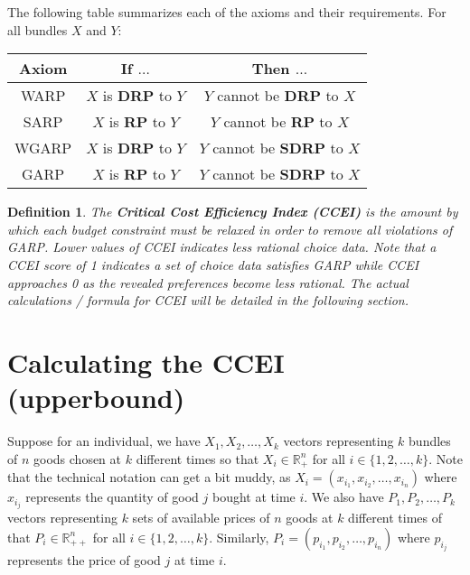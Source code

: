 \documentclass{article} %
\newtheorem{definition}{Definition} %
\begin{document}
The following table summarizes each of the axioms and their requirements. For all bundles $X$ and $Y$:

\renewcommand{\arraystretch}{1.5}
\begin{center}
\begin{tabular}{ c|c|c } 
Axiom & If $\ldots$ & Then $\ldots$ \\\hline
WARP&$X$ is \textbf{DRP} to $Y$&$Y$ cannot be \textbf{DRP} to $X$ \\
SARP&$X$ is \textbf{RP} to $Y$&$Y$ cannot be \textbf{RP} to $X$ \\
WGARP&$X$ is \textbf{DRP} to $Y$&$Y$ cannot be \textbf{SDRP} to $X$ \\
GARP&$X$ is \textbf{RP} to $Y$&$Y$ cannot be \textbf{SDRP} to $X$
\end{tabular}
\end{center}
\renewcommand{\arraystretch}{1}

\begin{definition}
The \textbf{Critical Cost Efficiency Index (CCEI)} is the amount by which each budget
constraint must be relaxed in order to remove all violations of GARP. Lower values of CCEI indicates less rational choice data. Note that a CCEI score of 1 indicates a set of choice data satisfies GARP while CCEI approaches 0 as the revealed preferences become less rational. The actual calculations / formula for CCEI will be detailed in the following section.
\end{definition}

\section{Calculating the CCEI (upperbound)}
Suppose for an individual, we have $X_{1}, X_{2}, \ldots, X_{k}$ vectors representing $k$ bundles of $n$ goods chosen at $k$ different times so that $X_{i}\in\mathbb{R}^{n}_{+}$ for all $i\in\{1,2,\ldots,k\}$. Note that the technical notation can get a bit muddy, as $X_{i}=(x_{i_{1}}, x_{i_{2}}, \ldots, x_{i_{n}})$ where $x_{i_{j}}$ represents the quantity of good $j$ bought at time $i$. We also have $P_{1}, P_{2}, \dots, P_{k}$ vectors representing $k$ sets of available prices of $n$ goods at $k$ different times of that $P_{i}\in\mathbb{R}^{n}_{++}$ for all $i\in\{1,2,\ldots,k\}$. Similarly, $P_{i}=(p_{i_{1}}, p_{i_{2}}, \ldots, p_{i_{n}})$ where $p_{i_{j}}$ represents the price of good $j$ at time $i$.
\end{document}
